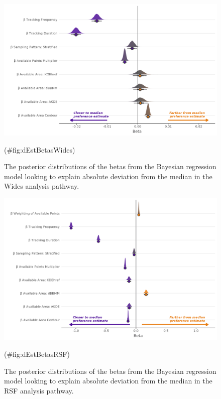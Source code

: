 \documentclass[10pt,a4paper]{article}
\begin{document}
\begin{figure}
\includegraphics[width=1\linewidth]{../figures/wides_dEstWides_effectsPlot} \caption{The posterior distributions of the betas from the Bayesian regression model looking to explain absolute deviation from the median in the Wides analysis pathway.}(\#fig:dEstBetasWides)
\end{figure}

\begin{figure}
\includegraphics[width=1\linewidth]{../figures/rsf_dEstRSF_effectsPlot} \caption{The posterior distributions of the betas from the Bayesian regression model looking to explain absolute deviation from the median in the RSF analysis pathway.}(\#fig:dEstBetasRSF)
\end{figure}
\end{document}
